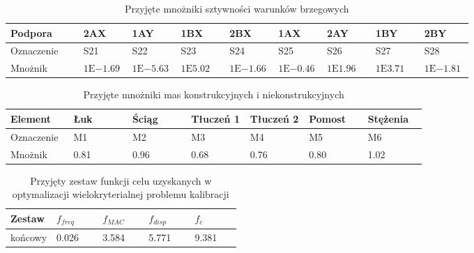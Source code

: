 \begin{table}[hbt!]
	
	\caption{Przyjęte mnożniki sztywności warunków brzegowych}
	\centering
	\label{tab:calibration_supports_prov}
	\footnotesize
	\setlength\tabcolsep{0pt}
	\begin{tabular}{@{}p{0.15\linewidth} *8{P{0.10625\linewidth}}@{}}
		\toprule
		Podpora    & 2AX               & 1AY               & 1BX               & 2BX               & 1AX               & 2AY               & 1BY               & 2BY               \\ \midrule
		Oznaczenie & S21               & S22               & S23               & S24               & S25               & S26               & S27               & S28               \\ \midrule
		Mnożnik   & $1\mathrm{E}{-1.69}$ & $1\mathrm{E}{-5.63}$ & $1\mathrm{E}{5.02}$ & $1\mathrm{E}{-1.66}$ & $1\mathrm{E}{-0.46}$ & $1\mathrm{E}{1.96}$ & $1\mathrm{E}{3.71}$ & $1\mathrm{E}{-1.81}$ \\ \bottomrule
	\end{tabular}
\end{table}

\begin{table}[hbt!]
	\caption{Przyjęte mnożniki mas konstrukcyjnych i niekonstrukcyjnych}
	\label{tab:calibration_mass_prov}
	\footnotesize
	\setlength\tabcolsep{0pt}
	\begin{tabular}{@{}p{0.15\linewidth} *6{P{0.1417\linewidth}}@{}}
		\toprule
		Element    & Łuk & Ściąg & Tłuczeń 1 & Tłuczeń 2 & Pomost & Stężenia \\ \midrule 
		Oznaczenie & M1  & M2    & M3        & M4        & M5     & M6       \\ \midrule
		Mnożnik   & 0.81 & 0.96   & 0.68       & 0.76       & 0.80    & 1.02       \\ \bottomrule
	\end{tabular}
\end{table}


\begin{table}[hbt!]
	\caption{Przyjęty zestaw funkcji celu uzyskanych w optymalizacji wielokryterialnej problemu kalibracji}
	\centering
	\footnotesize
	\setlength\tabcolsep{0pt}
	\begin{tabular}{@{}P{0.2\linewidth} *4{P{0.2\linewidth}}@{}}	
		\toprule
		Zestaw & $f_{freq}$ & $f_{MAC}$ & $f_{disp}$ & $f_{c}$ \\ \midrule
		końcowy & 0.026			& 3.584		  & 5.771		   & 9.381		\\ \bottomrule
	\end{tabular}
	\label{tab:minimal_values_calibration_prov}
\end{table}

